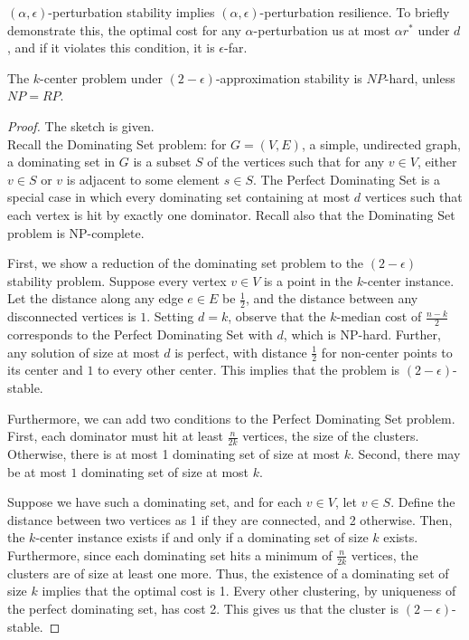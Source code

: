 \begin{remark}
$(\alpha,\epsilon)$-perturbation stability implies $(\alpha,\epsilon)$-perturbation resilience. To briefly demonstrate this, the optimal cost for any $\alpha$-perturbation us at most $\alpha r^*$ under $d$, and if it violates this condition, it is $\epsilon$-far.
\end{remark}

\begin{theorem}
The $k$-center problem under $(2-\epsilon)$-approximation stability is $NP$-hard, unless $NP=RP$.
\end{theorem}

\begin{proof}
The sketch is given. \cite{bendavid}\\

Recall the Dominating Set problem: for $G=(V,E)$, a simple, undirected graph, a dominating set in $G$ is a subset $S$ of the vertices such that for any $v\in V$, either $v\in S$ or $v$ is adjacent to some element $s\in S$. The Perfect Dominating Set is a special case in which every dominating set containing at most $d$ vertices such that each vertex is hit by exactly one dominator. Recall also that the Dominating Set problem is NP-complete.

First, we show a reduction of the dominating set problem to the $(2-\epsilon)$ stability problem. Suppose every vertex $v\in V$ is a point in the $k$-center instance. Let the distance along any edge $e\in E$ be $\frac12$, and the distance between any disconnected vertices is $1$. Setting $d=k$, observe that the $k$-median cost of $\frac{n-k}{2}$ corresponds to the Perfect Dominating Set with $d$, which is NP-hard. Further, any solution of size at most $d$ is perfect, with distance $\frac12$ for non-center points to its center and $1$ to every other center. This implies that the problem is $(2-\epsilon)$-stable.

Furthermore, we can add two conditions to the Perfect Dominating Set problem. First, each dominator must hit at least $\frac n{2k}$ vertices, the size of the clusters. Otherwise, there is at most 1 dominating set of size at most $k$. Second, there may be at most $1$ dominating set of size at most $k$.

Suppose we have such a dominating set, and for each $v\in V$, let $v\in S$. Define the distance between two vertices as 1 if they are connected, and 2 otherwise. Then, the $k$-center instance exists if and only if a dominating set of size $k$ exists. Furthermore, since each dominating set hits a minimum of $\frac n{2k}$ vertices, the clusters are of size at least one more. Thus, the existence of a dominating set of size $k$ implies that the optimal cost is 1. Every other clustering, by uniqueness of the perfect dominating set, has cost 2. This gives us that the cluster is $(2-\epsilon)$-stable.
\end{proof}

